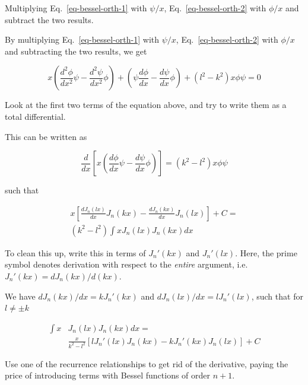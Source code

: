 \begin{cue}
Multiplying Eq.~\ref{eq-bessel-orth-1} with $\psi/x$, Eq.~\ref{eq-bessel-orth-2} with $\phi/x$ and subtract the two results.  
\end{cue}

By multiplying Eq.~\ref{eq-bessel-orth-1} with $\psi/x$, Eq.~\ref{eq-bessel-orth-2} with $\phi/x$ and subtracting the two results, we get

\begin{equation}
x \left( \frac{d^2 \phi}{dx^2}\psi - \frac{d^2 \psi}{dx^2} \phi \right) + \left(\psi \frac{d \phi}{dx}- \frac{d \psi}{dx}\phi\right) + \left(l^2 - k^2\right) x \phi \psi = 0
\end{equation}

\begin{cue}
Look at the first two terms of the equation above, and try to write them as a total differential. 
\end{cue}

This can be written as

\begin{equation}
\frac{d}{dx}\left[x \left( \frac{d \phi}{dx} \psi - \frac{d \psi}{dx} \phi\right)\right] = \left(k^2 - l^2\right) x \phi \psi
\end{equation}

such that

\begin{align}
x \left[{\frac{dJ_n(lx)}{dx}  J_n(kx) - \frac{dJ_n(kx)}{dx} J_n(lx)}\right] + C = \nonumber \\ \left(k^2 - l^2\right)\int x J_n(lx)J_n(kx)dx
\end{align}

\begin{cue}
To clean this up, write this in terms of $J_n'(kx)$ and  $J_n'(lx)$. Here, the prime symbol denotes derivation with respect to the \emph{entire} argument, i.e. $J_n'(kx)=dJ_n(kx)/d(kx)$. 
\end{cue}

We have $dJ_n(kx)/dx = kJ_n'(kx)$ and $dJ_n(lx)/dx = lJ_n'(lx)$, such that for $l \ne \pm k$

\begin{align}
  \int x & J_n(lx)J_n(kx)dx = \nonumber \\
  & \frac{x}{k^2 - l^2} \left[{l J_n'(lx) J_n(kx) -  k J_n'(kx) J_n(lx)}\right] + C \label{eq-lommel-1}
\end{align} 

\begin{cue}
Use one of the recurrence relationships to get rid of the derivative, paying the price of introducing terms with Bessel functions of order $n+1$.
\end{cue}


